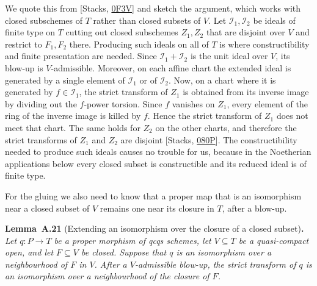 \documentclass[11pt]{article}
\newenvironment{bpstatement}[2]{\par\addvspace{0.6\baselineskip}\noindent\textbf{#1}#2\textbf{.}\enspace\ignorespaces}
  {\par\addvspace{0.4\baselineskip}}
\newenvironment{bpstatementit}[2]{\begin{bpstatement}{#1}{#2}\itshape\ignorespaces}{\end{bpstatement}}
\begin{document}
\label{bp54}%
We quote this from [Stacks, \href{https://stacks.math.columbia.edu/tag/0F3V}{0F3V}] and sketch the argument, which works with closed subschemes of \(T\) rather than closed subsets of \(V\). Let \(\mathcal I_1,\mathcal I_2\) be ideals of finite type on \(T\) cutting out closed subschemes \(Z_1,Z_2\) that are disjoint over \(V\) and restrict to \(F_1,F_2\) there. Producing such ideals on all of \(T\) is where constructibility and finite presentation are needed. Since \(\mathcal I_1+\mathcal I_2\) is the unit ideal over \(V\), its blow-up is \(V\)-admissible. Moreover, on each affine chart the extended ideal is generated by a single element of \(\mathcal I_1\) or of \(\mathcal I_2\). Now, on a chart where it is generated by \(f\in\mathcal I_1\), the strict transform of \(Z_1\) is obtained from its inverse image by dividing out the \(f\)-power torsion. Since \(f\) vanishes on \(Z_1\), every element of the ring of the inverse image is killed by \(f\). Hence the strict transform of \(Z_1\) does not meet that chart. The same holds for \(Z_2\) on the other charts, and therefore the strict transforms of \(Z_1\) and \(Z_2\) are disjoint [Stacks, \href{https://stacks.math.columbia.edu/tag/080P}{080P}]. The constructibility needed to produce such ideals causes no trouble for us, because in the Noetherian applications below every closed subset is constructible and its reduced ideal is of finite type.

For the gluing we also need to know that a proper map that is an isomorphism near a closed subset of \(V\) remains one near its closure in \(T\), after a blow-up.

\label{bp55}%
\begin{bpstatementit}{Lemma~A.21}{ (Extending an isomorphism over the closure of a closed subset)}
Let \(q:P\to T\) be a proper morphism of qcqs schemes, let \(V\subseteq T\) be a quasi-compact open, and let \(F\subseteq V\) be closed. Suppose that \(q\) is an isomorphism over a neighbourhood of \(F\) in \(V\). After a \(V\)-admissible blow-up, the strict transform of \(q\) is an isomorphism over a neighbourhood of the closure of \(F\).
\end{bpstatementit}
\end{document}
